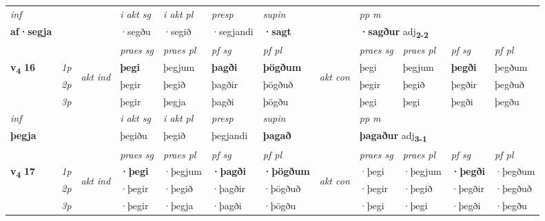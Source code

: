 \begin{longtable}[l]{X>{\footnotesize\itshape}llXXXXlXXXX}
   {\textit{inf}} & &  & \textit{i akt sg} & \textit{i akt pl}   & \textit{presp} & \textit{supin}  && \textit{pp m} \\*
  {\textbf{af\allowbreak ·segja}} & && ·segðu  & ·segið   & ·segjandi &  \textbf{·sagt}  && \multicolumn{2}{l}{\textbf{·sagður} adj\textbf{\textsubscript{2-2}}} \\*

\midrule

 & &   & \textit{praes sg}  & \textit{praes pl}    & \textit{ pf sg} & \textit{pf pl} & & \textit{praes sg}  & \textit{praes pl}    & \textit{pf sg} & \textit{pf pl }  \\ \cmidrule{4-7} \cmidrule{9-12}
 \multirow{2}{*}{{{\textbf{v{\textsubscript{4}}} \Large{\textbf{16}}}}}  & 1p & \multirow{3}{*}{\begin{turn}{90}\textit{akt ind}\end{turn}} & \textbf{þegi} & þegjum & \textbf{þagði} & \textbf{þögðum} & \multirow{3}{*}{\begin{turn}{90}\textit{akt con}\end{turn}} &þegi & þegjum & \textbf{þegði} & þegðum\\*
 & 2p &  &  þegir  & þegið & þagðir & þögðuð & & þegir & þegið & þegðir & þegðuð \\*
 & 3p &  & þegir & þegja & þagði & þögðu & & þegi & þegi& þegði & þegðu \\*
\cmidrule{4-7} \cmidrule{9-12}

   {\textit{inf}} & &  & \textit{i akt sg} & \textit{i akt pl}   & \textit{presp} & \textit{supin}  && \textit{pp m} \\*
  {\textbf{þegja}} & && þegiðu  & þegið   & þegjandi &  \textbf{þagað}  && \multicolumn{2}{l}{\textbf{þagaður} adj\textbf{\textsubscript{3-1}}} \\*

\midrule

 & &   & \textit{praes sg}  & \textit{praes pl}    & \textit{ pf sg} & \textit{pf pl} & & \textit{praes sg}  & \textit{praes pl}    & \textit{pf sg} & \textit{pf pl }  \\ \cmidrule{4-7} \cmidrule{9-12}
 \multirow{2}{*}{{{\textbf{v{\textsubscript{4}}} \Large{\textbf{17}}}}}  & 1p & \multirow{3}{*}{\begin{turn}{90}\textit{akt ind}\end{turn}} & \textbf{·þegi} & ·þegjum & \textbf{·þagði} & \textbf{·þögðum} & \multirow{3}{*}{\begin{turn}{90}\textit{akt con}\end{turn}} &·þegi & ·þegjum & \textbf{·þegði} & ·þegðum\\*
 & 2p &  &  ·þegir  & ·þegið & ·þagðir & ·þögðuð & & ·þegir & ·þegið & ·þegðir & ·þegðuð \\*
 & 3p &  & ·þegir & ·þegja & ·þagði & ·þögðu & & ·þegi & ·þegi& ·þegði & ·þegðu \\*
\cmidrule{4-7} \cmidrule{9-12}


\end{longtable}

